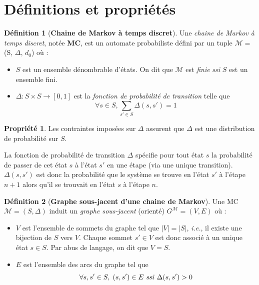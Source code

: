 \documentclass[12pt,a4paper]{report}
\theoremstyle{definition}
\newtheorem{definition}{Définition}[chapter]
\newtheorem{propriete}{Propriété}[chapter]
\theoremstyle{remark}
\newcommand{\ssi}{\textit{ssi} }
\newcommand{\ie}{\textit{i.e.}, }
\let\labelitemi\labelitemii
\begin{document}
\section{Définitions et propriétés}
\theoremstyle{definition}
\begin{definition}[\textbf{Chaine de Markov à temps discret}]
	
	Une \textit{chaine de Markov à temps discret}, notée \textbf{MC}, est un automate probabiliste défini par un tuple  $\mathcal{M} =$ (S, $\Delta$, $d_0$) où :
	\begin{itemize}
		\renewcommand{\labelitemi}{\tiny$\bullet$}
		\item $S$ est un ensemble dénombrable d'états. On dit que $\mathcal{M}$ est \textit{finie} \ssi $S$ est un ensemble fini.
		\item $\Delta: S \times S \rightarrow [0,1]$ est la \textit{fonction de probabilité de transition} telle que \[\forall s \in S, \sum_{s' \in S}\Delta(s, s')= 1\]
	\end{itemize}
\end{definition}

\begin{propriete}
	Les contraintes imposées sur $\Delta$ assurent que $\Delta$ est une distribution de probabilité sur $S$.
\end{propriete}
La fonction de probabilité de transition $\Delta$ spécifie pour tout état $s$ la probabilité de passer de cet état $s$ à l'état $s'$ en une étape (via une unique transition). 
$\Delta(s, s')$ est donc la probabilité que le système se trouve en l'état $s'$ à l'étape $n+1$ alors qu'il se trouvait en l'état $s$ à l'étape $n$. \\

\begin{definition}[\textbf{Graphe sous-jacent d'une chaine de Markov}]
	Une MC $\mathcal{M} = (S, \Delta)$ induit un \textit{graphe sous-jacent} (orienté) $G^\mathcal{M} = (V, E)$ où :
	\begin{itemize}
		\renewcommand{\labelitemi}{\tiny$\bullet$}
		\item $V$ est l'ensemble de sommets du graphe tel que $|V| = |S|$, \ie il existe une bijection de $S$ vers $V$. Chaque sommet $s' \in V$ est donc associé à un unique état $s \in S$. Par abus de langage, on dit que $V = S$.
		\item $E$ est l'ensemble des arcs du graphe tel que \[ \forall s, s' \in S, \; (s, s') \in E \text{ \ssi} \Delta(s, s') > 0\]
	\end{itemize}
\end{definition}
\end{document}
